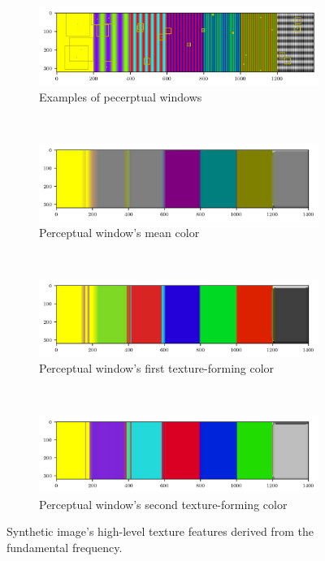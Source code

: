 \documentclass[journal]{IEEEtran}
\begin{document}
\begin{figure}[!ht]
    \centering
    \begin{subfigure}[b]{0.5\textwidth}
    	\includegraphics[width=\textwidth]{perceptual_windows_synth_25}
        \caption{Examples of pecerptual windows}
        \label{fig:perceptual_windows_synth_25}
    \end{subfigure}\\
    \begin{subfigure}[b]{0.5\textwidth}
    	\includegraphics[width=\textwidth]{perceptual_mean_color_synth}
        \caption{Perceptual window's mean color}
        \label{fig:perceptual_mean_color_synth}
    \end{subfigure}\\
    \begin{subfigure}[b]{0.5\textwidth}
    	\includegraphics[width=\textwidth]{perceptual_color1_synth}
        \caption{Perceptual window's first texture-forming color}
        \label{fig:perceptual_color1_synth}
    \end{subfigure}\\
    \begin{subfigure}[b]{0.5\textwidth}
    	\includegraphics[width=\textwidth]{perceptual_color2_synth}
        \caption{Perceptual window's second texture-forming color}
        \label{fig:perceptual_color2_synth}
    \end{subfigure}    
                  
    \caption{Synthetic image's high-level texture features derived from the fundamental frequency.}\label{fig:colors_high_level_features_synth}    
\end{figure}
\end{document}
